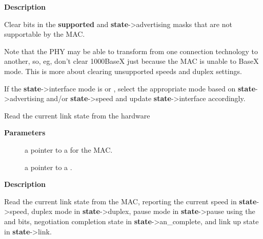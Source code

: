 \documentclass[a4paper,8pt,english]{sphinxmanual}
\begin{document}
\textbf{Description}

Clear bits in the \textbf{supported} and \textbf{state}-\textgreater{}advertising masks that
are not supportable by the MAC.

Note that the PHY may be able to transform from one connection
technology to another, so, eg, don't clear 1000BaseX just
because the MAC is unable to BaseX mode. This is more about
clearing unsupported speeds and duplex settings.

If the \textbf{state}-\textgreater{}interface mode is 
or , select the appropriate mode
based on \textbf{state}-\textgreater{}advertising and/or \textbf{state}-\textgreater{}speed and update
\textbf{state}-\textgreater{}interface accordingly.

\begin{fulllineitems}
\label{networking/kapi:c.mac_link_state}
Read the current link state from the hardware

\end{fulllineitems}


\textbf{Parameters}
\begin{description}
\item[{}] \leavevmode
a pointer to a {\hyperref[networking/kapi:c.net_device]{\emph{}}} for the MAC.

\item[{}] \leavevmode
a pointer to a {\hyperref[networking/kapi:c.phylink_link_state]{\emph{}}}.

\end{description}

\textbf{Description}

Read the current link state from the MAC, reporting the current
speed in \textbf{state}-\textgreater{}speed, duplex mode in \textbf{state}-\textgreater{}duplex, pause mode
in \textbf{state}-\textgreater{}pause using the  and  bits,
negotiation completion state in \textbf{state}-\textgreater{}an\_complete, and link
up state in \textbf{state}-\textgreater{}link.
\end{document}
